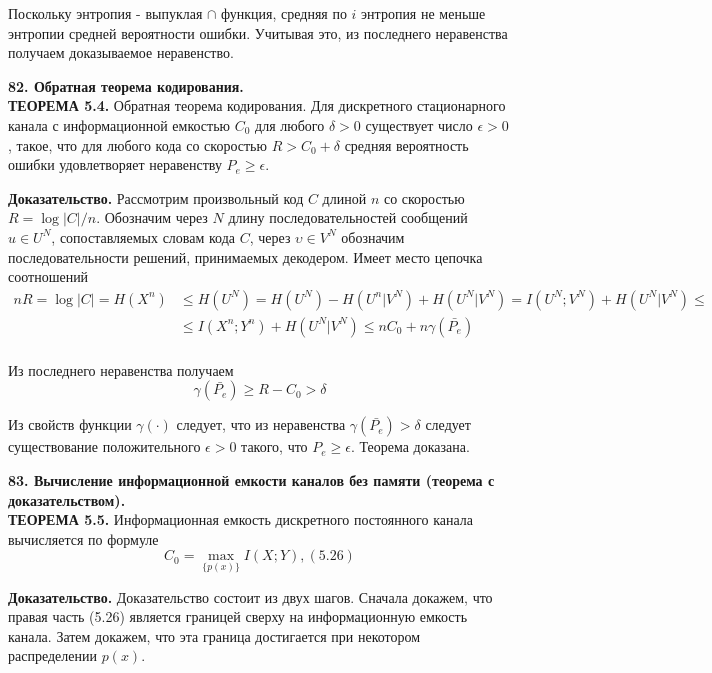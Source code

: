 \documentclass[14pt]{article}
\begin{document}
Поскольку энтропия - выпуклая \(\cap\) функция, средняя по \(i\) энтропия
не меньше энтропии средней вероятности ошибки. Учитывая это, из
последнего неравенства получаем доказываемое неравенство.

\bigskip
\textbf{82. Обратная теорема кодирования.} \\

\textbf{ТЕОРЕМА 5.4.} Обратная теорема кодирования. Для дискретного
стационарного канала с информационной емкостью \(C_0\) для любого
\(\delta > 0\) существует число \(\epsilon > 0\), такое, что для любого кода со
скоростью \(R > C_0 + \delta\) средняя вероятность ошибки удовлетворяет
неравенству \(P_e \geq \epsilon\).

\textbf{Доказательство.} Рассмотрим произвольный код \(C\) длиной \(n\) со
скоростью \(R = \log|C|/n\). Обозначим через \(N\) длину последовательностей
сообщений \(u \in U^N\), сопоставляемых словам кода \(C\), через \(\upsilon \in V^N\)
обозначим последовательности решений, принимаемых декодером.
Имеет место цепочка соотношений
\begin{displaymath}
    \begin{aligned}
        nR = \log|C| = H(X^n) & \leq H(U^N) = H(U^N) - H(U^n|V^N) + H(U^N|V^N) = I(U^N;V^N) + H(U^N|V^N) \leq \\
        & \leq I(X^n;Y^n) + H(U^N|V^N) \leq nC_0 + n\gamma(\bar{P_e}) \\
    \end{aligned}
\end{displaymath}

Из последнего неравенства получаем
\begin{displaymath}
    \gamma(\bar{P_e}) \geq R - C_0 > \delta
\end{displaymath}

Из свойств функции \(\gamma(\cdot)\) следует, что из неравенства \(\gamma(\bar{P_e}) > \delta\)
следует существование положительного \(\epsilon > 0\) такого, что \(P_e \geq \epsilon\).
Теорема доказана.

\bigskip
\textbf{83. Вычисление информационной емкости каналов без памяти (теорема с доказательством).} \\

\textbf{ТЕОРЕМА 5.5.} Информационная емкость дискретного
постоянного канала вычисляется по формуле
\begin{displaymath}
    C_0 = \max_{\{p(x)\}} I(X;Y), (5.26)
\end{displaymath}

\textbf{Доказательство.} Доказательство состоит из двух шагов. Сначала
докажем, что правая часть (5.26) является границей сверху на
информационную емкость канала. Затем докажем, что эта граница
достигается при некотором распределении \(p(x)\).
\end{document}
